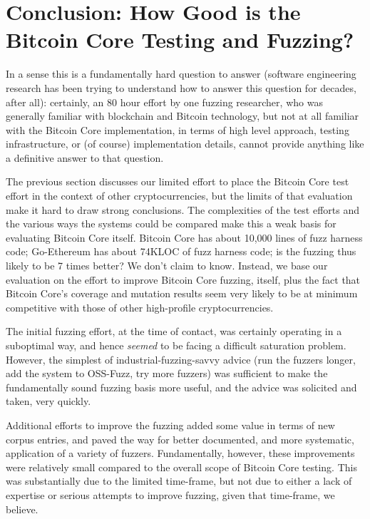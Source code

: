 \section{Conclusion: How Good is the Bitcoin Core Testing and Fuzzing?}

In a sense this is a fundamentally hard question to answer (software
engineering research has been trying to understand how to answer this question for
decades, after all): certainly,
an 80 hour effort by one fuzzing researcher, who was generally
familiar with blockchain and Bitcoin technology, but not at all
familiar with the Bitcoin Core implementation, in terms of high level
approach, testing infrastructure, or (of course) implementation details,
cannot provide anything like a definitive answer to that question.

The previous section discusses our limited effort to place the Bitcoin
Core test effort in the context of other cryptocurrencies, but the
limits of that evaluation make it hard to draw strong conclusions.
The complexities of the test efforts and the various ways the systems
could be compared make this a weak basis for evaluating Bitcoin Core itself.
Bitcoin Core has about 10,000 lines of fuzz harness code; Go-Ethereum
has about 74KLOC of fuzz harness code; is the fuzzing thus likely to
be 7 times better?  We don't claim to know.  Instead, we base our
evaluation on the effort to improve Bitcoin Core fuzzing, itself, plus
the fact that Bitcoin Core's coverage and mutation results seem very
likely to be at minimum competitive with those of other high-profile cryptocurrencies.

The initial fuzzing effort, at the time of contact, was certainly
operating in a suboptimal way,
and hence \emph{seemed} to be facing a difficult saturation problem.
However, the simplest of industrial-fuzzing-savvy advice (run the fuzzers longer, add the system
to OSS-Fuzz, try more fuzzers) was sufficient to make the
fundamentally sound fuzzing basis more useful, and the advice was
solicited and taken, very quickly.

Additional efforts to improve the fuzzing added some value in terms of
new corpus entries, and paved
the way for better documented, and more systematic, application of a
variety of fuzzers.  Fundamentally, however, these improvements were
relatively small compared to the overall scope of Bitcoin Core testing.
This was substantially due to the limited time-frame, but not due to either a
lack of expertise or serious attempts to improve fuzzing, given that
time-frame, we believe.

